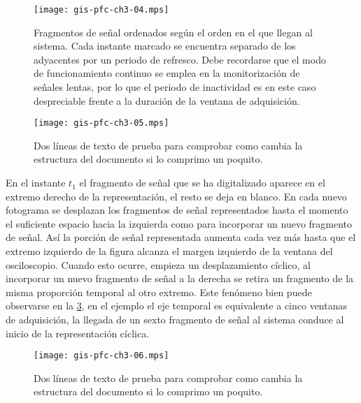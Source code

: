 \begin{figure}
	\begin{center}
		\texttt{[image: gis-pfc-ch3-04.mps]}
	\end{center}
	\caption[Fragmentos de señal ordenados según el orden en el que
	llegan al sistema]{Fragmentos de señal ordenados según el orden en
	el que llegan al sistema. Cada instante marcado se encuentra
	separado de los adyacentes por un periodo de refresco. Debe
	recordarse que el modo de funcionamiento continuo se emplea en la
	monitorización de señales lentas, por lo que el periodo de
	inactividad es en este caso despreciable frente a la duración de la
	ventana de adquisición.}
	\label{fig:freesignalcont}
\end{figure}

\begin{figure}
	\begin{center}
		\texttt{[image: gis-pfc-ch3-05.mps]}
	\end{center}
	\caption[Dos líneas de prueba]{Dos líneas de texto de prueba para
	comprobar como cambia la estructura del documento si lo comprimo un
	poquito.}
	\label{fig:modconti}
\end{figure}

En el instante $t_1$ el fragmento de señal que se ha digitalizado aparece
en el extremo derecho de la representación, el resto se deja en blanco. En
cada nuevo fotograma se desplazan los fragmentos de señal representados
hasta el momento el suficiente espacio hacia la izquierda como para
incorporar un nuevo fragmento de señal. Así la porción de señal
representada aumenta cada vez más hasta que el extremo izquierdo de la
figura alcanza el margen izquierdo de la ventana del osciloscopio. Cuando
esto ocurre, empieza un desplazamiento cíclico, al incorporar un nuevo
fragmento de señal a la derecha se retira un fragmento de la misma
proporción temporal al otro extremo. Este fenómeno bien puede observarse en
la \cref{fig:modcontii}, en el ejemplo el eje temporal es equivalente a
cinco ventanas de adquisición, la llegada de un sexto fragmento de señal al
sistema conduce al inicio de la representación cíclica.

\begin{figure}
	\begin{center}
		\texttt{[image: gis-pfc-ch3-06.mps]}
	\end{center}
	\caption[Dos líneas de prueba]{Dos líneas de texto de prueba para
	comprobar como cambia la estructura del documento si lo comprimo un
	poquito.}
	\label{fig:modcontii}
\end{figure}

